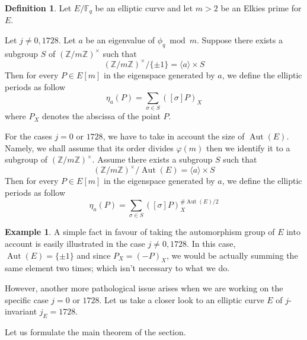 \documentclass[12pt]{article}
\theoremstyle{plain}
\theoremstyle{definition}
\newtheorem{definition}[theorem]{Definition}
\newtheorem{example}[theorem]{Example}
\DeclareMathOperator{\Aut}{Aut}
\def\Z{\ensuremath{\mathbb{Z}}}
\def\F{\ensuremath{\mathbb{F}}}
\begin{document}
\begin{definition}
\label{definition:ellperiod}
Let $E/\F_q$ be an elliptic curve and let $m>2$ be an Elkies prime for $E$.

Let $j\neq0, 1728$. Let $a$ be an eigenvalue of $\phi_q \bmod m$. Suppose there 
exists a subgroup $S$ of $(\Z/m\Z)^{\times}$ such that 
\begin{equation}
(\Z/m\Z)^{\times}/\lbrace{\pm1}\rbrace = \langle{a}\rangle \times S
\end{equation}
Then for every $P\in E[m]$ in the eigenspace generated by $a$, we define
the elliptic periods as follow
\begin{equation}
\eta_{a}(P) = \sum_{\sigma\in S}{\left([\sigma]P\right)_X}
\end{equation}
where $P_X$ denotes the abscissa of the point $P$.

For the cases $j = 0$ or $1728$, we have to take in account the size
of $\Aut(E)$. Namely, we shall assume that its order divides $\varphi(m)$
then we identify it to a subgroup of $(\Z/m\Z)^{\times}$. Assume there exists a
subgroup $S$ such that
\begin{equation}
(\Z/m\Z)^{\times}/\Aut(E) = \langle{a}\rangle\times S
\end{equation}
Then for every $P\in E[m]$ in the eigenspace generated by $a$, we define
the elliptic periods as follow
\begin{equation}
\eta_{a}(P) = \sum_{\sigma\in
S}{\left([\sigma]P\right)_X^{\#\Aut(E)/2}}
\end{equation}

\end{definition}

\begin{example}
A simple fact in favour of taking the automorphism group of $E$ into account is
easily illustrated in the case $j\neq0,1728$. In this case, $\Aut(E) =
\lbrace{\pm1}\rbrace$ and since $P_X = (-P)_X$, we would be actually summing the
same element two times; which isn't necessary to what we do.

However, another more pathological issue arises when we are working on the
specific case $j = 0$ or $1728$. Let us take a closer look to an elliptic curve
$E$ of $j$-invariant $j_E = 1728$. %

\end{example}

Let us formulate the main theorem of the section. 
\end{document}
